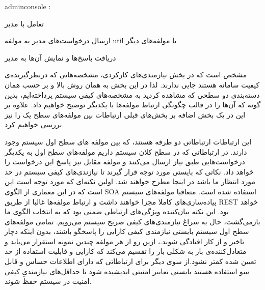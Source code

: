 \begin{itemize}	

	 adminconsole : 

	\begin{itemize}	

		 	تعامل با مدیر

			ارسال درخواست‌های مدیر به مولفه util	یا مولفه‌های دیگر

		  	دریافت پاسخ‌ها و نمایش آ‌ن‌ها به مدیر

		

	\end{itemize}

\end{itemize}	







مشخص است که در بخش نیازمندی‌های کارکردی، مشخصه‌هایی که درنظرگیرنده‌ی کیفیت سامانه هستند جایی ندارند. لذا در این بخش به همان روش بالا و بر حسب همان دسته‌بندی دو سطحی که مشاهده کردید به مشخصه‌های کیفی سیستم پرداخته‌ایم، بدین گونه که آن‌ها را در قالب چگونگی ارتباط مولفه‌ها با یکدیگر توضیح خواهیم داد. علاوه بر این در یک بخش اضافه بر بخش‌های قبلی ارتباطات بین مولفه‌های سطح یک را نیز بررسی خواهیم کرد.










این ارتباطات ارتباطاتی دو طرفه هستند، که بین مولفه های سطح اول سیستم وجود دارند.  ‌در ارتباطاتی که در سطح کلان سیستم داریم مولفه‌های سطح اول به یکدیگر درخواست‌هایی طبق نیاز ارسال می‌کنند و مولفه مقابل نیز پاسخ این درخواست را خواهد داد. نکاتی که بایستی مورد توجه قرار گیرند تا  نیازندی‌های کیفی سیستم در حد مورد انتظار ما باشد در اینجا مطرح خواهند شد. اولین نکته‌ای که مورد توجه است این است که در این معماری از الگوی SOA استفاده شده است. متعاقبا مولفه‌های سیستم پیاده‌سازی‌های کاملا مجزا خواهند داشت و ارتباط مولفه‌ها غالبا از طریق REST خواهد بود. این نکته بیان‌کننده ویژگی‌های ارتباطی ضمنی بود که به انتخاب الگوی ما بازمی‌گشت، حال به سراغ نیازمندی‌های کیفی صریح سیستم می‌رویم. تمامی مولفه‌های سطح اول سیستم بایستی  نیازمندی کیفی کارایی را  پاسخگو باشند، بدون اینکه دچار تاخیر و از کار افتادگی شوند.، ازین رو از هر مولفه چندین نمونه استقرار می‌یابد و  متعادل‌کننده‌ی بار   به شکلی بار را تقسیم می‌کند که کارایی و  قابلیت استفاده از حد تعیین شده کمتر نشود.از سوی دیگر برای ارتباطاتی که دارای اطلاعات حساس و قابل سو استفاده هستند بایستی تعابیر امنیتی اندیشیده شود تا حداقل‌های نیازمندیِ کیفی امنیت در سیستم حفظ شوند. 

